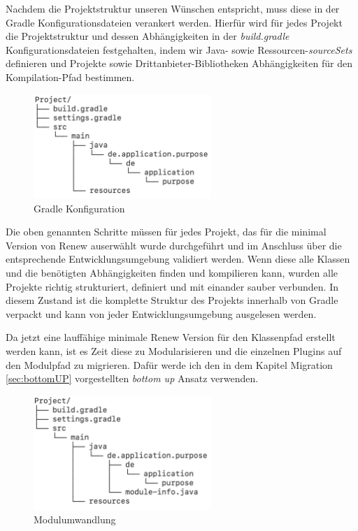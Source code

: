 	Nachdem die Projektstruktur unseren Wünschen entspricht, muss diese in der Gradle Konfigurationsdateien verankert werden. Hierfür wird für jedes Projekt die Projektstruktur und dessen Abhängigkeiten in der \textit{build.gradle} Konfigurationsdateien festgehalten, indem wir Java- sowie Ressourcen-\textit{sourceSets} definieren und Projekte sowie Drittanbieter-Bibliotheken Abhängigkeiten für den  Kompilation-Pfad bestimmen.

	\begin{figure}[h!]
	  \centering
	  \includegraphics[width=0.6\textwidth]{material/images/gradle_project.png}
	  \caption{Gradle Konfiguration}
	  \label{fig:gradle_project}
	\end{figure}

 	Die oben genannten Schritte müssen für jedes Projekt, das für die minimal Version von Renew auserwählt wurde durchgeführt und im Anschluss über die entsprechende Entwicklungsumgebung  validiert werden. Wenn diese alle Klassen und die benötigten Abhängigkeiten finden und kompilieren kann, wurden alle Projekte richtig strukturiert, definiert und mit einander sauber verbunden. In diesem Zustand ist die komplette Struktur des Projekts innerhalb von Gradle verpackt und kann von jeder Entwicklungsumgebung ausgelesen werden. 


	Da jetzt eine lauffähige minimale Renew Version für den Klassenpfad erstellt werden kann, ist es Zeit diese zu Modularisieren und die einzelnen Plugins auf den Modulpfad zu migrieren. Dafür werde ich den in dem Kapitel Migration \ref{sec:bottomUP} vorgestellten \textit{bottom up} Ansatz verwenden. 

	\begin{figure}[h!]
	  \centering
	  \includegraphics[width=0.6\textwidth]{material/images/module_project.png}
	  \caption{Modulumwandlung}
	  \label{fig:module_project}
	\end{figure}

